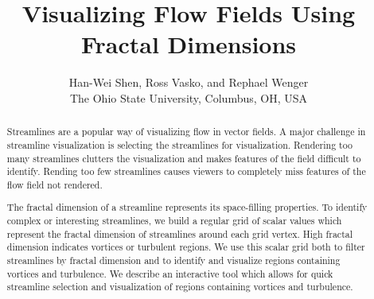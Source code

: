 \documentclass{egpubl}
\title{Visualizing Flow Fields Using Fractal Dimensions}
\author[Han-Wei Shen, Ross Vasko, \& Rephael Wenger]
	{Han-Wei Shen, Ross Vasko, and Rephael Wenger
	\\
	The Ohio State University, Columbus, OH, USA
	}
\begin{document}
\maketitle

\begin{abstract}
Streamlines are a popular way of visualizing flow in vector fields.
A major challenge in streamline visualization is selecting the streamlines for visualization.
Rendering too many streamlines clutters the visualization and makes features of the field difficult to identify. 
Rending too few streamlines causes viewers to completely miss features of the flow field not rendered. 

The fractal dimension of a streamline represents its space-filling properties.
To identify complex or interesting streamlines, we build a regular grid of scalar values which represent the fractal dimension of streamlines around each grid vertex.
High fractal dimension indicates vortices or turbulent regions.
We use this scalar grid both to filter streamlines by fractal dimension and to identify and visualize regions containing vortices and turbulence.
We describe an interactive tool which allows for quick streamline selection and visualization of regions containing vortices and turbulence.
\\
\begin{classification}
\end{classification}

\end{abstract}






\end{document}
